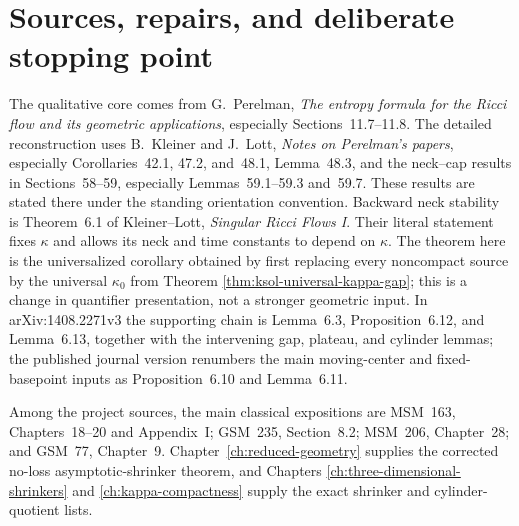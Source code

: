 \documentclass[10pt]{coll-l}
\theoremstyle{definition}
\theoremstyle{remark}
\numberwithin{section}{chapter}
\numberwithin{equation}{chapter}
\begin{document}
\section{Sources, repairs, and deliberate stopping point}
\label{sec:ncs-sources}

The qualitative core comes from G.~Perelman,
\emph{The entropy formula for the Ricci flow and its geometric
applications}, especially Sections~11.7--11.8.  The detailed reconstruction
uses B.~Kleiner and J.~Lott, \emph{Notes on Perelman's papers}, especially
Corollaries~42.1, 47.2, and~48.1, Lemma~48.3, and the neck--cap results in
Sections~58--59, especially Lemmas~59.1--59.3 and~59.7.  These results are
stated there under the standing orientation convention.  Backward neck
stability is Theorem~6.1 of Kleiner--Lott, \emph{Singular Ricci Flows I}.
Their literal statement fixes $\kappa$ and allows its neck and time
constants to depend on $\kappa$.  The theorem here is the universalized
corollary obtained by first replacing every noncompact source by the
universal $\kappa_0$ from Theorem
\ref{thm:ksol-universal-kappa-gap}; this is a change in quantifier
presentation, not a stronger geometric input.
In arXiv:1408.2271v3 the supporting chain is Lemma~6.3,
Proposition~6.12, and Lemma~6.13, together with the intervening gap,
plateau, and cylinder lemmas; the published journal version renumbers the
main moving-center and fixed-basepoint inputs as Proposition~6.10 and
Lemma~6.11.

Among the project sources, the main classical expositions are MSM~163,
Chapters~18--20 and Appendix~I; GSM~235, Section~8.2; MSM~206,
Chapter~28; and GSM~77, Chapter~9.  Chapter~\ref{ch:reduced-geometry}
supplies the corrected no-loss asymptotic-shrinker theorem, and Chapters
\ref{ch:three-dimensional-shrinkers} and
\ref{ch:kappa-compactness} supply the exact shrinker and cylinder-quotient
lists.
\end{document}
